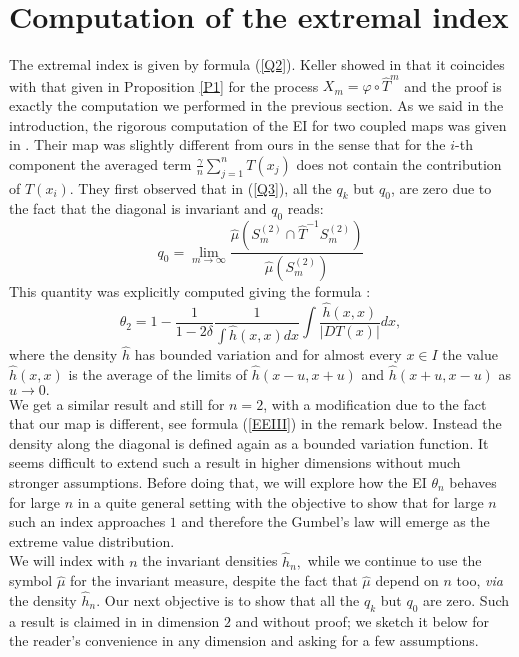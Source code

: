 \documentclass[12pt,reqno,a4paper]{amsart}
\let\phi\varphi
\newcommand{\T}{{\mathcal{T}}}
\def\T{\hat{T}}
\begin{document}
\section{Computation of the extremal index}
The extremal index is given by formula (\ref{Q2}). Keller showed in \cite {KE} that it coincides with that given in Proposition \ref{P1} for the process $X_m=\phi\circ\hat{T}^m$ and the proof is exactly the computation we performed in the previous section.   As we said in the introduction, the rigorous computation of the EI for two coupled maps was given in \cite{CG}. Their map was slightly different from ours in the sense that for the $i$-th component the averaged  term $\frac{\gamma}{n}\sum_{j=1}^n T(x_j)$ does not contain the contribution of $T(x_i).$ They first observed that in (\ref{Q3}), all the $q_k$  but $q_0$, are zero due to the fact that the diagonal is invariant and $q_0$ reads:
\begin{equation}\label{q0}
q_0=\lim_{m\rightarrow \infty}\frac{\hat{\mu}(S^{(2)}_m\cap \T^{-1}S^{(2)}_m)}{\hat{\mu}(S^{(2)}_m)}
\end{equation}
This quantity  was explicitly computed  giving the formula \cite{CG}:
$$
            \theta_2=1-\frac{1}{1-2\delta}\frac{1}{\int \hat{h}(x,x)  dx}\int \frac{\hat{h}(x,x)}{|DT(x)|}dx,
            $$
where the density $\hat{h}$ has bounded variation and  for almost every $x\in I$ the
  value $\hat{h}(x, x)$ is the average of the limits of $\hat{h}(x-u, x+u)$ and $\hat{h}(x + u, x-u)$ as $u\rightarrow 0.$ \\

 We get a similar result  and still for $n=2$, with a modification due to the fact that
our map is different, see formula (\ref{EEIII}) in the remark below. Instead   the density along the diagonal is defined again as a bounded variation function.
It seems difficult to extend such a result in higher dimensions without
 much stronger assumptions. Before doing that, we will explore how the EI
 $\theta_n$ behaves for large $n$ in a quite general setting with the
 objective to show that for large $n$ such an index approaches $1$ and therefore
 the Gumbel's law will emerge as the extreme value distribution.
 \\We will  index with $n$ the invariant densities  $\hat{h}_n,$
   while we continue to use the symbol $\hat{\mu}$ for the invariant measure,
    despite the fact that $\hat{\mu}$ depend on $n$ too, {\em via} the density $\hat{h}_n.$
Our next objective is to show that all the $q_k$ but $q_0$ are zero. Such a result is
    claimed in \cite{CG} in dimension $2$ and  without proof; we sketch it  below for the reader's convenience in any dimension and asking for a few assumptions.
\end{document}
